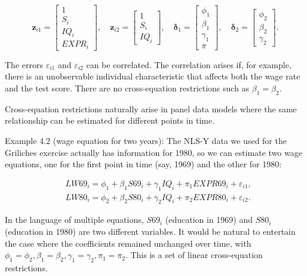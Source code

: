 \documentclass[10pt]{article}
\begin{document}
\[
\mathbf{z}_{i 1}=\left[\begin{array}{c}
1  \tag{4.1.2}\\
S_{i} \\
I Q_{i} \\
E X P R_{i}
\end{array}\right], \quad \mathbf{z}_{i 2}=\left[\begin{array}{c}
1 \\
S_{i} \\
I Q_{i}
\end{array}\right], \quad \boldsymbol{\delta}_{1}=\left[\begin{array}{l}
\phi_{1} \\
\beta_{1} \\
\gamma_{1} \\
\pi
\end{array}\right], \quad \boldsymbol{\delta}_{2}=\left[\begin{array}{l}
\phi_{2} \\
\beta_{2} \\
\gamma_{2}
\end{array}\right] .
\]

The errors $\varepsilon_{i 1}$ and $\varepsilon_{i 2}$ can be correlated. The correlation arises if, for example, there is an unobservable individual characteristic that affects both the wage rate and the test score. There are no cross-equation restrictions such as $\beta_{1}=\beta_{2}$.

Cross-equation restrictions naturally arise in panel data models where the same relationship can be estimated for different points in time.

Example 4.2 (wage equation for two years): The NLS-Y data we used for the Griliches exercise actually has information for 1980, so we can estimate two wage equations, one for the first point in time (say, 1969) and the other for 1980:

$$
\begin{aligned}
& L W 69_{i}=\phi_{1}+\beta_{1} S 69_{i}+\gamma_{1} I Q_{i}+\pi_{1} E X P R 69_{i}+\varepsilon_{i 1}, \\
& L W 80_{i}=\phi_{2}+\beta_{2} S 80_{i}+\gamma_{2} I Q_{i}+\pi_{2} E X P R 80_{i}+\varepsilon_{i 2} .
\end{aligned}
$$

In the language of multiple equations, $S 69_{i}$ (education in 1969) and $S 80_{i}$ (education in 1980) are two different variables. It would be natural to entertain the case where the coefficients remained unchanged over time, with $\phi_{1}=\phi_{2}, \beta_{1}=\beta_{2}, \gamma_{1}=\gamma_{2}, \pi_{1}=\pi_{2}$. This is a set of linear cross-equation restrictions.
\end{document}
